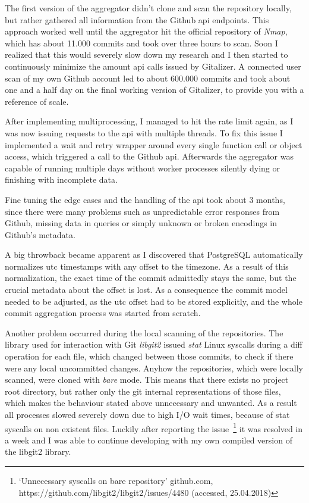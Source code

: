 The first version of the aggregator didn't clone and scan the repository locally, but rather gathered all information from the Github \ac{api} endpoints.
This approach worked well until the aggregator hit the official repository of \emph{Nmap}, which has about 11.000 commits and took over three hours to scan.
Soon I realized that this would severely slow down my research and I then started to continuously minimize the amount \ac{api} calls issued by Gitalizer.
A connected user scan of my own Github account led to about 600.000 commits and took about one and a half day on the final working version of Gitalizer, to provide you with a reference of scale.

After implementing multiprocessing, I managed to hit the rate limit again, as I was now issuing requests to the \ac{api} with multiple threads.
To fix this issue I implemented a wait and retry wrapper around every single function call or object access, which triggered a call to the Github \ac{api}.
Afterwards the aggregator was capable of running multiple days without worker processes silently dying or finishing with incomplete data.

Fine tuning the edge cases and the handling of the \ac{api} took about 3 months, since there were many problems such as unpredictable error responses from Github, missing data in queries or simply unknown or broken encodings in Github's metadata.

A big throwback became apparent as I discovered that PostgreSQL automatically normalizes \ac{utc} timestamps with any offset to the  timezone.
As a result of this normalization, the exact time of the commit admittedly stays the same, but the crucial metadata about the offset is lost.
As a consequence the commit model needed to be adjusted, as the \ac{utc} offset had to be stored explicitly, and the whole commit aggregation process was started from scratch.

Another problem occurred during the local scanning of the repositories.
The library used for interaction with Git \emph{libgit2} issued \emph{stat} Linux syscalls during a diff operation for each file, which changed between those commits, to check if there were any local uncommitted changes.
Anyhow the repositories, which were locally scanned, were cloned with \emph{bare} mode.
This means that there exists no project root directory, but rather only the git internal representations of those files, which makes the behaviour stated above unnecessary and unwanted.
As a result all processes slowed severely down due to high I/O wait times, because of stat syscalls on non existent files.
Luckily after reporting the issue~\footnote{`Unnecessary syscalls on bare repository' github.com, https://github.com/libgit2/libgit2/issues/4480 (accessed, 25.04.2018)} it was resolved in a week and I was able to continue developing with my own compiled version of the libgit2 library.

